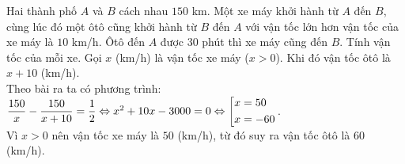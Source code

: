 \begin{ex}%
    Hai thành phố $A$ và $B$ cách nhau $150$ km. Một xe máy khởi hành từ $A$ đến $B$, cùng lúc đó một ôtô cũng khởi hành từ $B$ đến $A$ với vận tốc lớn hơn vận tốc của xe máy là $10$ km/h. Ôtô đến $A$ được $30$ phút thì xe máy cũng đến $B$. Tính vận tốc của mỗi xe.
\loigiai
    {
    Gọi $x$ (km/h) là vận tốc xe máy ($x>0$). Khi đó vận tốc ôtô là $x+10$ (km/h).\\
    Theo bài ra ta có phương trình: \\
    $\dfrac{150}{x}-\dfrac{150}{x+10}=\dfrac{1}{2}\Leftrightarrow x^2+10x-3000=0\Leftrightarrow \left[\begin{aligned}&x=50\\&x=-60\end{aligned}\right.$.\\
    Vì $x>0$ nên vận tốc xe máy là $50$ (km/h), từ đó suy ra vận tốc ôtô là $60$ (km/h).
    }
\end{ex}

